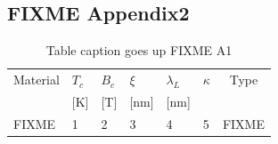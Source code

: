 \begin{appendices}
\subsection{FIXME Appendix2}
\begin{table}[htbp]
	\renewcommand{\arraystretch}{1.6}
	\setlength{\tabcolsep}{10pt}
	\caption{Table caption goes up FIXME A1}
	\label{tbl3_1}
	\centering
	\begin{tabular}{l l l l l l c}
	\hline\hline
	Material & $T_c$ & $B_c$& $\xi$ & $\lambda_L$ & $\kappa$ & Type \\
	\hfill & [K] & [T] & [nm] & [nm] & \hfill & \hfill \\
	\hline
	FIXME & 1 & 2 & 3 & 4 & 5 & FIXME \\
	\hline\hline
	\end{tabular}
\end{table}
\lipsum[1-2]~\cite{anderson1964hard}

\end{appendices}
